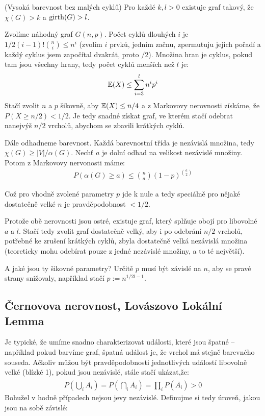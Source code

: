 \vt (Vysoká barevnost bez malých cyklů) Pro každé $k,l > 0$ existuje graf 
takový, že $\chi(G) > k$ a $\operatorname{girth}(G) > l$.

\dk Zvolíme náhodný graf $G(n,p)$. Počet cyklů dlouhých $i$ je 
$1/2(i-1)!\binom{n}{i}\leq n^i$ (zvolím $i$ prvků, jedním začnu, zpermutuju 
jejich pořadí a každý cyklus jsem započítal dvakrát, proto $/2$). Množina hran 
je cyklus, pokud tam jsou všechny hrany, tedy počet cyklů menších než $l$ je:
\begin{align}
	\mathbb{E}(X) \leq \sum_{i=3}^l n^ip^i
\end{align}
Stačí zvolit $n$ a $p$ šikovně, aby $\mathbb{E}(X) \leq n/4$ a z Markovovy nerovnosti 
získáme, že $P(X \geq n/2) < 1/2$. Je tedy snadné získat graf, ve kterém stačí 
odebrat nanejvýš $n/2$ vrcholů, abychom se zbavili krátkých cyklů.

Dále odhadneme barevnost. Každá barevnostní třída je nezávislá množina, tedy 
$\chi(G) \geq |V| / \alpha(G)$. Nechť $a$ je dolní odhad na velikost nezávislé 
množiny. Potom z Markovovy nervonosti máme:
\begin{align}
	P(\alpha(G) \geq a) \leq \binom{n}{a}(1-p)^{\binom{a}{2}}
\end{align}

Což pro vhodně zvolené parametry $p$ jde k nule a tedy speciálně pro nějaké 
dostatečně velké $n$ je pravděpodobnost $< 1/2$.

Protože obě nerovnosti jsou ostré, existuje graf, který splňuje obojí pro 
libovolné $a$ a $l$. Stačí tedy zvolit graf dostatečně velký, aby i po odebrání 
$n/2$ vrcholů, potřebné ke zrušení krátkých cyklů, zbyla dostatečně velká 
nezávislá množina (teoreticky mohu odebírat pouze z jedné nezávislé množiny, a 
to té největší).

A jaké jsou ty šikovné parametry? Určitě $p$ musí být závislé na $n$, aby se 
pravé strany snižovaly, například stačí $p := n^{1/2l -1}$.

\subsection{Černovova nerovnost, Lovászovo Lokální Lemma}

Je typické, že umíme snadno charakterizovat události, které jsou špatné -- 
například pokud barvíme graf, špatná událost je, že vrchol má stejně barevného 
souseda. Ačkoliv můžou být pravděpodobnosti jednotlivých událostí libovolně 
velké (blízké 1), pokud jsou nezávislé, stále stačí ukázat,že:
\begin{align}
	\overline{P\left(\bigcup_i A_i\right)} = P\left(\bigcap_i 
	\overline{A_i}\right) = \prod_i P(\overline{A_i})> 0
\end{align}
Bohužel v hodně případech nejsou jevy nezávislé. Definujme si tedy úroveň, jakou
jsou na sobě závislé:


